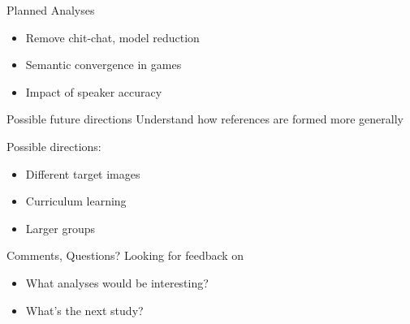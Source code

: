 \documentclass[ 12pt, xcolor=beamer,table,usenames,dvipsnames, ignorenonframetext, ngerman]{beamer}
\begin{document}
\begin{frame}{Planned Analyses}
	\begin{itemize}
		\item Remove chit-chat, model reduction
		\item Semantic convergence in games
		\item Impact of speaker accuracy
	\end{itemize}
\end{frame}


\begin{frame}{Possible future directions}
	Understand how references are formed more generally \pause
	
	Possible directions: \pause
\begin{itemize}
	\item Different target images \pause
	\item Curriculum learning \pause
	\item Larger groups
\end{itemize}

\end{frame}

\begin{frame}{Comments, Questions?}
	Looking for feedback on
	\smallskip
	\begin{itemize}
	\item What analyses would be interesting?
	\item What's the next study?
	\end{itemize}
\end{frame}

\appendix

\end{document}
